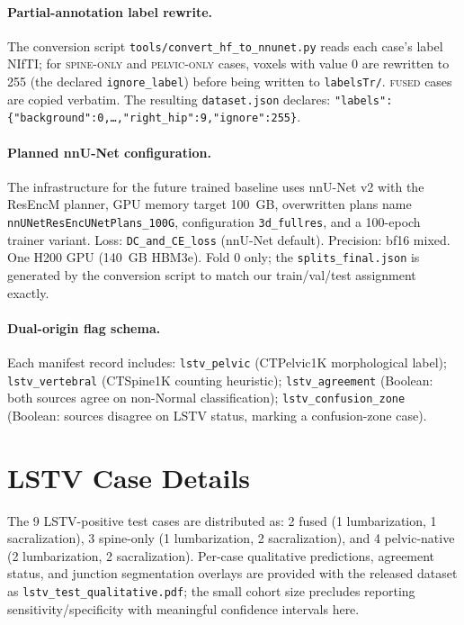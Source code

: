 \documentclass[pmlr]{jmlr}
\begin{document}
\paragraph{Partial-annotation label rewrite.}
The conversion script \texttt{tools/convert\_hf\_to\_nnunet.py}
reads each case's label NIfTI; for
\textsc{spine-only} and \textsc{pelvic-only} cases, voxels with
value 0 are rewritten to 255 (the declared \texttt{ignore\_label})
before being written to \texttt{labelsTr/}.
\textsc{fused} cases are copied verbatim. The resulting
\texttt{dataset.json} declares:
\texttt{"labels":\{"background":0,\dots,"right\_hip":9,"ignore":255\}}.

\paragraph{Planned nnU-Net configuration.}
The infrastructure for the future trained baseline uses nnU-Net v2
with the ResEncM planner, GPU memory target 100~GB, overwritten
plans name \texttt{nnUNetResEncUNetPlans\_100G}, configuration
\texttt{3d\_fullres}, and a 100-epoch trainer variant.
Loss: \texttt{DC\_and\_CE\_loss} (nnU-Net default). Precision: bf16
mixed. One H200 GPU (140~GB HBM3e). Fold 0 only; the
\texttt{splits\_final.json} is generated by the conversion script
to match our train/val/test assignment exactly.

\paragraph{Dual-origin flag schema.}
Each manifest record includes:
\texttt{lstv\_pelvic} (CTPelvic1K morphological label);
\texttt{lstv\_vertebral} (CTSpine1K counting heuristic);
\texttt{lstv\_agreement} (Boolean: both sources agree on non-Normal
classification);
\texttt{lstv\_confusion\_zone} (Boolean: sources disagree on LSTV
status, marking a confusion-zone case).

\section{LSTV Case Details}
\label{app:lstv_cases}

The 9 LSTV-positive test cases are distributed as:
2 fused (1 lumbarization, 1 sacralization), 3 spine-only
(1 lumbarization, 2 sacralization), and 4 pelvic-native
(2 lumbarization, 2 sacralization).
Per-case qualitative predictions, agreement status, and junction
segmentation overlays are provided with the released dataset as
\texttt{lstv\_test\_qualitative.pdf}; the small cohort size
precludes reporting sensitivity/specificity with meaningful
confidence intervals here.
\end{document}
